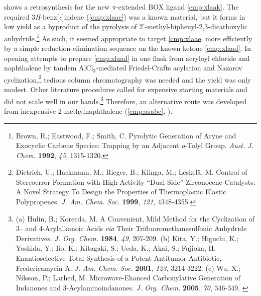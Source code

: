  shows a retrosynthesis for the new $\pi$-extended BOX ligand
\ref{cmp:xlaak}. The required 3\textit{H}-benz[\textit{e}]indene (\ref{cmp:xlaae}) was a known
material, but it forms in low yield as a byproduct of the pyrolysis of 2'-methyl-biphenyl-2,3-dicarboxylic anhydride.\footnote{{\frenchspacing Brown, R.; Eastwood, F.; Smith, C.
Pyrolytic Generation of Aryne and Exocyclic Carbene Species: Trapping by an Adjacent
\textit{o}-Tolyl Group. \textit{Aust. J. Chem.} \textbf{1992}, \textit{45}, 1315-1320.}} As such, it
seemed appropriate to target \ref{cmp:xlaae} more efficiently by a simple reduction-elimination
sequence on the known ketone \ref{cmp:xlaad}. In opening attempts to prepare \ref{cmp:xlaad} in one
flask from acryloyl chloride and naphthalene by tandem AlCl$_3$-mediated Friedel-Crafts acylation
and Nazarov cyclization,\footnote{{\frenchspacing Dietrich, U.; Hackmann, M.; Rieger, B.; Klinga,
M.; Leskel\"{a}, M. Control of Stereoerror Formation with High-Activity ``Dual-Side'' Zirconocene
Catalysts: A Novel Strategy To Design the Properties of Thermoplastic Elastic Polypropenes. \textit{J. Am. Chem. Soc.} \textbf{1999}, \textit{121}, 4348-4355.}} tedious column chromatography was needed and the yield was only modest.
Other literature procedures called for expensive starting materials and did not scale well in our
hands.\footnote{(a) {\frenchspacing Hulin, B.; Koreeda, M. A Convenient, Mild Method for the
Cyclization of 3-- and 4-Arylalkanoic Acids \textit{via} Their Trifluoromethanesulfonic Anhydride
Derivatives. \textit{J. Org. Chem.} \textbf{1984}, \textit{49}, 207-209.} (b) {\frenchspacing Kita,
Y.; Higuchi, K.; Yoshida, Y.; Iio, K.; Kitagaki, S.; Ueda, K.; Akai, S.; Fujioka, H.
Enantioselective Total Synthesis of a Potent Antitumor Antibiotic, Fredericamycin A. \textit{J. Am.
Chem. Soc.} \textbf{2001}, \textit{123}, 3214-3222.} (c) {\frenchspacing Wu, X.; Nilsson, P.;
Larhed, M. Microwave-Ehanced Carbonylative Generation of Indanones and 3-Acylaminoindanones.
\textit{J. Org. Chem.} \textbf{2005}, \textit{70}, 346-349.} \label{ref:astlalternatives}}
Therefore, an alternative route was developed from inexpensive 2-methylnaphthalene
(\ref{cmp:asabc}, ).

